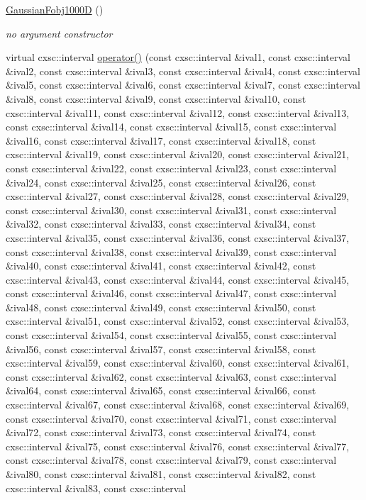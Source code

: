 \begin{DoxyCompactItemize}
\item 
\hyperlink{classGaussianFobj1000D_ac4905ad9fe103aa0842f69519549ff8c}{\-Gaussian\-Fobj1000\-D} ()
\begin{DoxyCompactList}\small\item\em no argument constructor \end{DoxyCompactList}\item 
virtual cxsc\-::interval \hyperlink{classGaussianFobj1000D_ae88cda6fd5feb67043212f85e9d48205}{operator()} (const cxsc\-::interval \&ival1, const cxsc\-::interval \&ival2, const cxsc\-::interval \&ival3, const cxsc\-::interval \&ival4, const cxsc\-::interval \&ival5, const cxsc\-::interval \&ival6, const cxsc\-::interval \&ival7, const cxsc\-::interval \&ival8, const cxsc\-::interval \&ival9, const cxsc\-::interval \&ival10, const cxsc\-::interval \&ival11, const cxsc\-::interval \&ival12, const cxsc\-::interval \&ival13, const cxsc\-::interval \&ival14, const cxsc\-::interval \&ival15, const cxsc\-::interval \&ival16, const cxsc\-::interval \&ival17, const cxsc\-::interval \&ival18, const cxsc\-::interval \&ival19, const cxsc\-::interval \&ival20, const cxsc\-::interval \&ival21, const cxsc\-::interval \&ival22, const cxsc\-::interval \&ival23, const cxsc\-::interval \&ival24, const cxsc\-::interval \&ival25, const cxsc\-::interval \&ival26, const cxsc\-::interval \&ival27, const cxsc\-::interval \&ival28, const cxsc\-::interval \&ival29, const cxsc\-::interval \&ival30, const cxsc\-::interval \&ival31, const cxsc\-::interval \&ival32, const cxsc\-::interval \&ival33, const cxsc\-::interval \&ival34, const cxsc\-::interval \&ival35, const cxsc\-::interval \&ival36, const cxsc\-::interval \&ival37, const cxsc\-::interval \&ival38, const cxsc\-::interval \&ival39, const cxsc\-::interval \&ival40, const cxsc\-::interval \&ival41, const cxsc\-::interval \&ival42, const cxsc\-::interval \&ival43, const cxsc\-::interval \&ival44, const cxsc\-::interval \&ival45, const cxsc\-::interval \&ival46, const cxsc\-::interval \&ival47, const cxsc\-::interval \&ival48, const cxsc\-::interval \&ival49, const cxsc\-::interval \&ival50, const cxsc\-::interval \&ival51, const cxsc\-::interval \&ival52, const cxsc\-::interval \&ival53, const cxsc\-::interval \&ival54, const cxsc\-::interval \&ival55, const cxsc\-::interval \&ival56, const cxsc\-::interval \&ival57, const cxsc\-::interval \&ival58, const cxsc\-::interval \&ival59, const cxsc\-::interval \&ival60, const cxsc\-::interval \&ival61, const cxsc\-::interval \&ival62, const cxsc\-::interval \&ival63, const cxsc\-::interval \&ival64, const cxsc\-::interval \&ival65, const cxsc\-::interval \&ival66, const cxsc\-::interval \&ival67, const cxsc\-::interval \&ival68, const cxsc\-::interval \&ival69, const cxsc\-::interval \&ival70, const cxsc\-::interval \&ival71, const cxsc\-::interval \&ival72, const cxsc\-::interval \&ival73, const cxsc\-::interval \&ival74, const cxsc\-::interval \&ival75, const cxsc\-::interval \&ival76, const cxsc\-::interval \&ival77, const cxsc\-::interval \&ival78, const cxsc\-::interval \&ival79, const cxsc\-::interval \&ival80, const cxsc\-::interval \&ival81, const cxsc\-::interval \&ival82, const cxsc\-::interval \&ival83, const cxsc\-::interval 
\end{DoxyCompactItemize}
